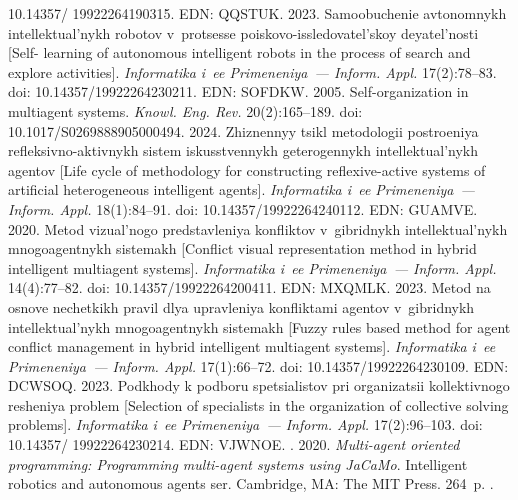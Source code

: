 \begin{multicols}{2}
{{\begin{thebibliography}{99}
10.14357/ 19922264190315. EDN: QQSTUK.
    2023. Samoobuchenie 
avtonomnykh intellektual'nykh robotov v~protsesse poiskovo-issledovatel'skoy deyatel'nosti [Self-
learning of autonomous intelligent robots in the process of search and explore activities]. 
\textit{Informatika i~ee Primeneniya~--- Inform. Appl.} 17(2):78--83. doi: 
10.14357/19922264230211. EDN: SOFDKW.
    2005. Self-organization in 
multiagent systems. \textit{Knowl. Eng. Rev.} 20(2):165--189. doi: 10.1017/S0269888905000494.
    2024. Zhiznennyy tsikl metodologii po\-stroeniya refleksivno-aktivnykh 
sistem iskusstvennykh geterogennykh intellektual'nykh agentov [Life cycle of methodology for 
constructing reflexive-active systems of artificial heterogeneous intelligent agents]. 
\textit{Informatika i~ee Primeneniya~--- Inform. Appl.} 18(1):84--91. doi: 
10.14357/19922264240112. EDN: GUAMVE.
    2020. Metod vizual'nogo predstavleniya konfliktov 
v~gibridnykh intellektual'nykh mnogoagentnykh sistemakh [Conflict visual representation method in hybrid 
intelligent multiagent systems]. \textit{Informatika i~ee Primeneniya~--- Inform. \mbox{Appl.}} 14(4):77--82. 
doi: 10.14357/19922264200411. EDN: MXQMLK.
    2023. Metod na osno\-ve nechetkikh pravil dlya 
upravleniya konfliktami agentov v~gib\-rid\-nykh intellektual'nykh mnogoagentnykh sistemakh [Fuzzy 
rules based method for agent conflict management in hybrid intelligent multiagent systems]. 
\textit{Informatika i~ee Primeneniya~--- Inform. Appl.} 17(1):66--72. doi: 
10.14357/19922264230109. EDN: DCWSOQ.
    2023. Podkhody k podboru spetsialistov pri organizatsii kollektivnogo 
resheniya problem [Selection of specialists in the organization of collective solving problems]. 
\textit{Informatika i~ee Primeneniya~--- Inform. \mbox{Appl.}} 17(2):96--103. doi: 10.14357/ 
19922264230214. EDN: VJWNOE.
   . 2020. \textit{Multi-agent 
oriented programming: Programming multi-agent systems using JaCaMo}. Intelligent robotics and 
autonomous agents ser. Cambridge, MA: The MIT Press. 264~p.
   . 

\end{thebibliography}}}
\end{multicols}
